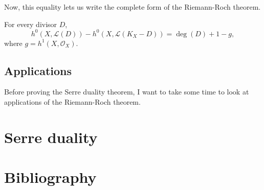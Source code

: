 \documentclass[12pt]{article}
\begin{document}
Now, this equality lets us write the complete form of the Riemann-Roch
theorem.
\begin{thm}\label{thm:riemann_roch_complete}
  For every divisor $D$,
  \[
    h^{0}(X, \mathcal{L}(D))-h^{0}(X, \mathcal{L}(K_{X}-D))=\deg(D)+1-g,
  \]
  where $g=h^{1}(X, \mathcal{O}_{X})$.
\end{thm}

\subsection{Applications}
Before proving the Serre duality theorem, I want to take some time to
look at applications of the Riemann-Roch theorem.

\section{Serre duality}

\section{Bibliography}


\end{document}

